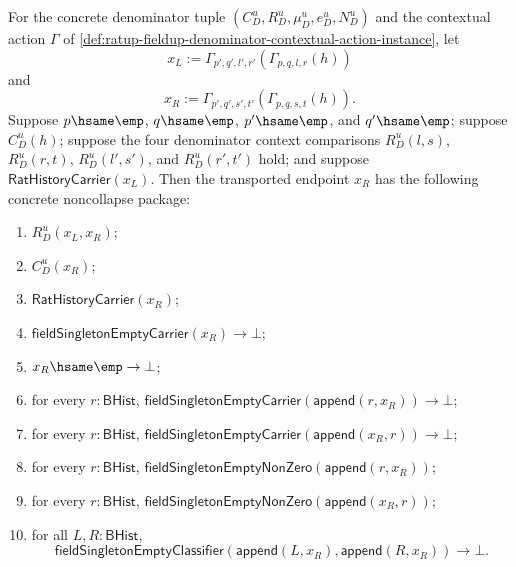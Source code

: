 \begin{theorem}
\label{thm:ratup-fieldup-contextual-pair-transport-full-noncollapse-invariance}
For the concrete denominator tuple $(C_D^u,R_D^u,\mu_D^u,e_D^u,N_D^u)$ and the
contextual action $\Gamma$ of
\autoref{def:ratup-fieldup-denominator-contextual-action-instance}, let
$$
x_L:=\Gamma_{p',q',l',r'}(\Gamma_{p,q,l,r}(h))
$$
and
$$
x_R:=\Gamma_{p',q',s',t'}(\Gamma_{p,q,s,t}(h)).
$$
Suppose $p\hsame\emp$, $q\hsame\emp$, $p'\hsame\emp$, and $q'\hsame\emp$;
suppose $C_D^u(h)$; suppose the four denominator context comparisons
$R_D^u(l,s)$, $R_D^u(r,t)$, $R_D^u(l',s')$, and $R_D^u(r',t')$ hold; and
suppose $\mathsf{RatHistoryCarrier}(x_L)$. Then the transported endpoint $x_R$
has the following concrete noncollapse package:
\begin{enumerate}
  \item $R_D^u(x_L,x_R)$;
  \item $C_D^u(x_R)$;
  \item $\mathsf{RatHistoryCarrier}(x_R)$;
  \item $\mathsf{fieldSingletonEmptyCarrier}(x_R)\to\bot$;
  \item $x_R\hsame\emp\to\bot$;
  \item for every $r:\mathsf{BHist}$,
  $\mathsf{fieldSingletonEmptyCarrier}(\mathsf{append}(r,x_R))\to\bot$;
  \item for every $r:\mathsf{BHist}$,
  $\mathsf{fieldSingletonEmptyCarrier}(\mathsf{append}(x_R,r))\to\bot$;
  \item for every $r:\mathsf{BHist}$,
  $\mathsf{fieldSingletonEmptyNonZero}(\mathsf{append}(r,x_R))$;
  \item for every $r:\mathsf{BHist}$,
  $\mathsf{fieldSingletonEmptyNonZero}(\mathsf{append}(x_R,r))$;
  \item for all $L,R:\mathsf{BHist}$,
  $$
  \mathsf{fieldSingletonEmptyClassifier}(\mathsf{append}(L,x_R),
  \mathsf{append}(R,x_R))\to\bot.
  $$
\end{enumerate}
\end{theorem}
